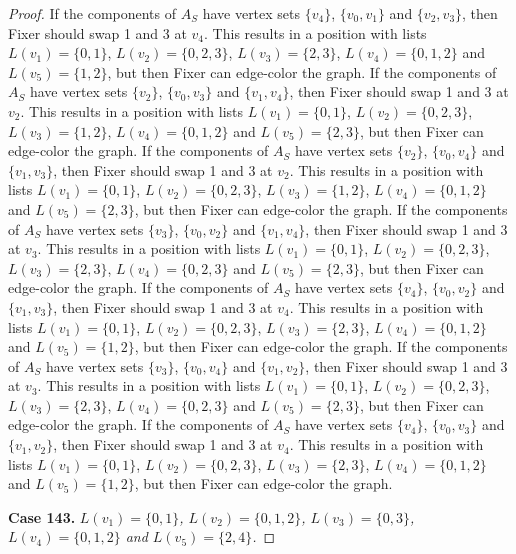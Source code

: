 \documentclass[12pt]{amsart}
\theoremstyle{plain}
\theoremstyle{definition}
\theoremstyle{remark}
\begin{document}
\begin{proof}
If the components of $A_S$ have vertex sets $\{v_4\}$, $\{v_0, v_1\}$ and $\{v_2, v_3\}$, then Fixer should swap 1 and 3 at $v_4$. This results in a position with lists $L(v_1) = \{0, 1\}$, $L(v_2) = \{0, 2, 3\}$, $L(v_3) = \{2, 3\}$, $L(v_4) = \{0, 1, 2\}$ and $L(v_5) = \{1, 2\}$, but then Fixer can edge-color the graph.
If the components of $A_S$ have vertex sets $\{v_2\}$, $\{v_0, v_3\}$ and $\{v_1, v_4\}$, then Fixer should swap 1 and 3 at $v_2$. This results in a position with lists $L(v_1) = \{0, 1\}$, $L(v_2) = \{0, 2, 3\}$, $L(v_3) = \{1, 2\}$, $L(v_4) = \{0, 1, 2\}$ and $L(v_5) = \{2, 3\}$, but then Fixer can edge-color the graph.
If the components of $A_S$ have vertex sets $\{v_2\}$, $\{v_0, v_4\}$ and $\{v_1, v_3\}$, then Fixer should swap 1 and 3 at $v_2$. This results in a position with lists $L(v_1) = \{0, 1\}$, $L(v_2) = \{0, 2, 3\}$, $L(v_3) = \{1, 2\}$, $L(v_4) = \{0, 1, 2\}$ and $L(v_5) = \{2, 3\}$, but then Fixer can edge-color the graph.
If the components of $A_S$ have vertex sets $\{v_3\}$, $\{v_0, v_2\}$ and $\{v_1, v_4\}$, then Fixer should swap 1 and 3 at $v_3$. This results in a position with lists $L(v_1) = \{0, 1\}$, $L(v_2) = \{0, 2, 3\}$, $L(v_3) = \{2, 3\}$, $L(v_4) = \{0, 2, 3\}$ and $L(v_5) = \{2, 3\}$, but then Fixer can edge-color the graph.
If the components of $A_S$ have vertex sets $\{v_4\}$, $\{v_0, v_2\}$ and $\{v_1, v_3\}$, then Fixer should swap 1 and 3 at $v_4$. This results in a position with lists $L(v_1) = \{0, 1\}$, $L(v_2) = \{0, 2, 3\}$, $L(v_3) = \{2, 3\}$, $L(v_4) = \{0, 1, 2\}$ and $L(v_5) = \{1, 2\}$, but then Fixer can edge-color the graph.
If the components of $A_S$ have vertex sets $\{v_3\}$, $\{v_0, v_4\}$ and $\{v_1, v_2\}$, then Fixer should swap 1 and 3 at $v_3$. This results in a position with lists $L(v_1) = \{0, 1\}$, $L(v_2) = \{0, 2, 3\}$, $L(v_3) = \{2, 3\}$, $L(v_4) = \{0, 2, 3\}$ and $L(v_5) = \{2, 3\}$, but then Fixer can edge-color the graph.
If the components of $A_S$ have vertex sets $\{v_4\}$, $\{v_0, v_3\}$ and $\{v_1, v_2\}$, then Fixer should swap 1 and 3 at $v_4$. This results in a position with lists $L(v_1) = \{0, 1\}$, $L(v_2) = \{0, 2, 3\}$, $L(v_3) = \{2, 3\}$, $L(v_4) = \{0, 1, 2\}$ and $L(v_5) = \{1, 2\}$, but then Fixer can edge-color the graph.

\noindent\textbf{Case 143.  }\textit{$L(v_1) = \{0, 1\}$, $L(v_2) = \{0, 1, 2\}$, $L(v_3) = \{0, 3\}$, $L(v_4) = \{0, 1, 2\}$ and $L(v_5) = \{2, 4\}$.}


\end{proof}
\end{document}
